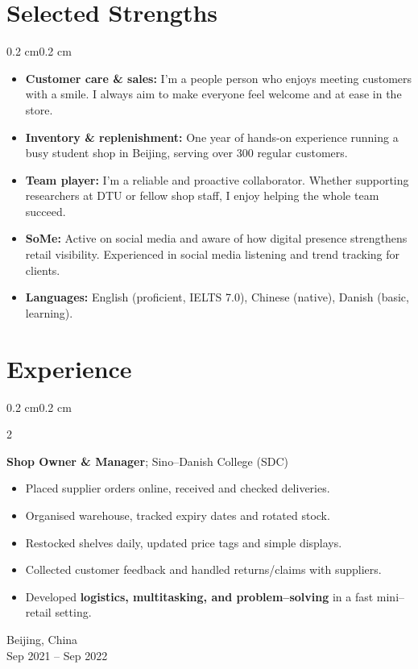\documentclass[10pt, letterpaper]{article}
\newenvironment{highlights}{
    \begin{itemize}[
        topsep=0.08 cm,
        parsep=0.08 cm,
        partopsep=0pt,
        itemsep=0pt,
        leftmargin=0.4 cm + 10pt
    ]
}{
    \end{itemize}
}
\newenvironment{onecolentry}{
    \begin{adjustwidth}{0.2 cm}{0.2 cm}
}{
    \end{adjustwidth}
}
\newenvironment{twocolentry}[2][]{
    \onecolentry
    \def\secondColumn{#2}
    \setcolumnwidth{\fill, 4.5 cm}
    \begin{paracol}{2}
}{
    \switchcolumn \raggedleft \secondColumn
    \end{paracol}
    \endonecolentry
}
\begin{document}
    \section{Selected Strengths}
    \begin{onecolentry}
        \begin{highlights}
    \item \textbf{Customer care \& sales:} I’m a people person who enjoys meeting customers with a smile. I always aim to make everyone feel welcome and at ease in the store.
    \item \textbf{Inventory \& replenishment:} One year of hands-on experience running a busy student shop in Beijing, serving over 300 regular customers.
    \item \textbf{Team player:}  I'm a reliable and proactive collaborator. Whether supporting researchers at DTU or fellow shop staff, I enjoy helping the whole team succeed.
    \item \textbf{SoMe:} Active on social media and aware of how digital presence strengthens retail visibility. Experienced in social media listening and trend tracking for clients.
    \item \textbf{Languages:} English (proficient, IELTS 7.0), Chinese (native), Danish (basic, learning).
\end{highlights}
    \end{onecolentry}

    \section{Experience}

    \begin{twocolentry}{
        Beijing, China\\
        Sep 2021 -- Sep 2022
    }
        \textbf{Shop Owner \& Manager}; Sino–Danish College (SDC)
        \begin{highlights}
            \item Placed supplier orders online, received and checked deliveries.
            \item Organised warehouse, tracked expiry dates and rotated stock.
            \item Restocked shelves daily, updated price tags and simple displays.
            \item Collected customer feedback and handled returns/claims with suppliers.
            \item Developed \textbf{logistics, multitasking, and problem–solving} in a fast mini–retail setting.
        \end{highlights}
    \end{twocolentry}
\end{document}
